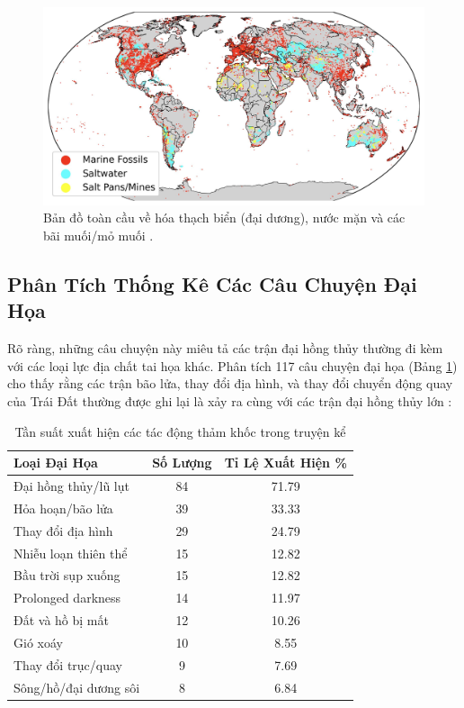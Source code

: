 \documentclass[10pt,twocolumn,letterpaper]{article}
\begin{document}
\begin{figure}[b]
\begin{center}
\includegraphics[width=1\textwidth]{marine.jpg}
\end{center}
   \caption{Bản đồ toàn cầu về hóa thạch biển (đại dương), nước mặn và các bãi muối/mỏ muối \cite{15,16,86,87}.}
   \label{fig:2}
\end{figure}

\subsection{Phân Tích Thống Kê Các Câu Chuyện Đại Họa}

Rõ ràng, những câu chuyện này miêu tả các trận đại hồng thủy thường đi kèm với các loại lực địa chất tai họa khác. Phân tích 117 câu chuyện đại họa (Bảng \ref{tab: 1}) cho thấy rằng các trận bão lửa, thay đổi địa hình, và thay đổi chuyển động quay của Trái Đất thường được ghi lại là xảy ra cùng với các trận đại hồng thủy lớn \cite{14}:

\begin{table}[ht]
\begin{center}
\renewcommand{\arraystretch}{1.2}  %
\begin{tabular}{|l|c|c|}
\hline
\textbf{Loại Đại Họa} & \textbf{Số Lượng} & \textbf{Tỉ Lệ Xuất Hiện \%} \\
\hline\hline
Đại hồng thủy/lũ lụt            & 84 & 71.79 \\
Hỏa hoạn/bão lửa                & 39 & 33.33 \\
Thay đổi địa hình               & 29 & 24.79 \\
Nhiễu loạn thiên thể            & 15 & 12.82 \\
Bầu trời sụp xuống              & 15 & 12.82 \\

Prolonged darkness      & 14 & 11.97 \\
Đất và hồ bị mất        & 12 & 10.26 \\
Gió xoáy                 & 10 & 8.55  \\
Thay đổi trục/quay      & 9 & 7.69  \\
Sông/hồ/đại dương sôi    & 8 & 6.84 \\
\hline
\end{tabular}
\end{center}
\caption{Tần suất xuất hiện các tác động thảm khốc trong truyện kể}
\label{tab: 1}
\end{table}
\end{document}
